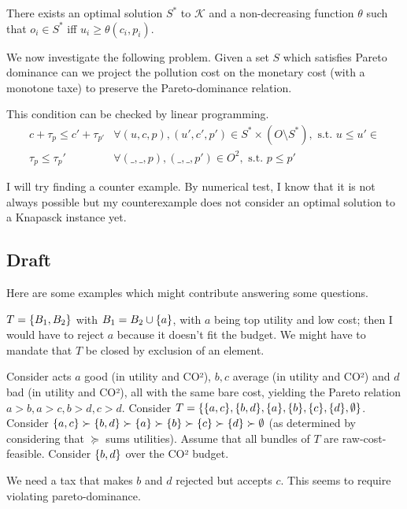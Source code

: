 \documentclass[version=3.21, pagesize, twoside=off, bibliography=totoc, DIV=calc, fontsize=12pt, a4paper, french, english]{scrartcl}
\begin{document}
\begin{corollary}
There exists an optimal solution $S^*$ to $\mathcal{K}$ and a non-decreasing function $\theta$ such that $o_i\in S^*$ iff $u_i \ge \theta(c_i,p_i)$.
\end{corollary}

We now investigate the following problem. Given a set $S$ which satisfies Pareto dominance can we project the pollution cost on the monetary cost (with a monotone taxe) to preserve the Pareto-dominance relation. 

This condition can be checked by linear programming. 
\begin{align}
c+\tau_p \le c' + \tau_{p'} &\forall (u,c,p), (u',c',p') \in S^*\times(O\setminus S^*) ,\text{ s.t. } u \le u' \in \\
\tau_p \le \tau_p' & \forall (\_,\_,p), (\_,\_,p') \in O^2 ,\text{ s.t. }  p \le p'
\end{align} 

I will try finding a counter example. By numerical test, I know that it is not always possible but my counterexample does not consider an optimal solution to a Knapasck instance yet.

\subsection{Draft}
Here are some examples which might contribute answering some questions.
\begin{example}
	$T = \{B_1, B_2\}$ with $B_1 = B_2 \cup \{a\}$, with $a$ being top utility and low cost; then I would have to reject $a$ because it doesn’t fit the budget.
	We might have to mandate that $T$ be closed by exclusion of an element.
\end{example}

\begin{example}
	Consider acts $a$ good (in utility and CO²), $b, c$ average (in utility and CO²) and $d$ bad (in utility and CO²), all with the same bare cost, yielding the Pareto relation $a > b, a > c, b > d, c > d$.
	Consider $T = \{\{a, c\}, \{b, d\}, \{a\}, \{b\}, \{c\}, \{d\}, \emptyset\}$. 
	Consider $\{a, c\} \succ \{b, d\} \succ \{a\} \succ \{b\} \succ \{c\} \succ \{d\} \succ \emptyset$ (as determined by considering that $\succeq$ sums utilities).
	Assume that all bundles of $T$ are raw-cost-feasible.
	Consider $\{b, d\}$ over the CO² budget.
	
	We need a tax that makes $b$ and $d$ rejected but accepts $c$.
	This seems to require violating pareto-dominance.
\end{example}
\end{document}
